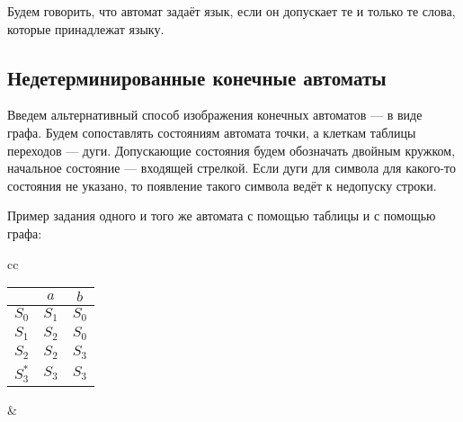 \documentclass[12pt,a4paper,oneside]{article}
\begin{document}
\begin{definition}
Будем говорить, что автомат задаёт язык, если он допускает те и только те слова, которые
принадлежат языку.
\end{definition}

\subsection{Недетерминированные конечные автоматы}

Введем альтернативный способ изображения конечных автоматов --- в виде графа.
Будем сопоставлять состояниям автомата точки, а клеткам таблицы переходов --- дуги.
Допускающие состояния будем обозначать двойным кружком, начальное состояние --- входящей стрелкой.
Если дуги для символа для какого-то состояния не указано, то появление такого символа ведёт к недопуску 
строки.

Пример задания одного и того же автомата с помощью таблицы и с помощью графа:
\vspace{3mm}

\begin{tabular}{cc}

\begin{minipage}{5cm}
\begin{tabular}{c|cc}
& $a$ & $b$\\
\hline
$S_0$ & $S_1$ & $S_0$\\
$S_1$ & $S_2$ & $S_0$\\
$S_2$ & $S_2$ & $S_3$\\
$S_3^*$ & $S_3$ & $S_3$\\

\end{tabular}

\end{minipage}

&

\begin{minipage}{8cm}

\end{minipage}

\end{tabular}
\end{document}
